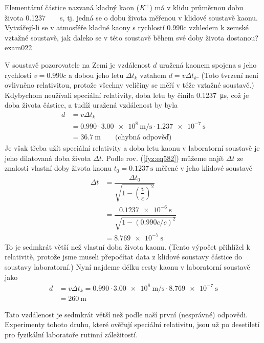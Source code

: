 \begin{fyzexam}{Elementární částice nazvaná kladný kaon (\(K^+\)) má v klidu průměrnou dobu života
  \protect\SI{0.1237}{\protect\micro\protect\s}, tj. jedná se o dobu života měřenou v klidové
  soustavě kaonu. Vytvářejí-li se v atmosféře kladné kaony s rychlostí \num{0.990}c vzhledem k
  zemské vztažné soustavě, jak daleko se v této soustavě během své doby života dostanou?
  \cite[s.~1014]{Halliday2001}}{exam022} 

  \vspace{1em}
  V soustavě pozorovatele na Zemi je vzdálenost \(d\) uražená kaonem spojena s jeho rychlostí \(v =
  \num{0.990}c\) a dobou jeho letu \(\Delta t_k\) vztahem \(d = v\Delta t_k\). (Toto tvrzení není
  ovlivněno relativitou, protože všechny veličiny se měří v téže vztažné soustavě.) Kdybychom
  neužívali speciální relativity, doba letu by činila \SI{0.1237}{\micro\s}, což je doba života
  částice, a tudíž uražená vzdálenost by byla
  \begin{align*}
    d &= v\Delta t_k                                                        \\
      &= \num{0.990}\cdot\SI{3.00e8}{\m\per\s}\cdot\SI{1.237e-7}{\s}        \\
      &= \SI{36.7}{\m}  \qquad\text{(chybná odpověď)} 
  \end{align*}  
  Je však třeba užít speciální relativity a doba letu kaonu v laboratorní soustavě je jeho
  dilatovaná doba života \(\Delta t\). Podle rov. (\ref{fyz:eq582}) můžeme najít \(\Delta t\) ze
  znalosti vlastní doby života kaonu \(t_0 = \SI{0.1237}{\s}\) měřené v jeho klidové soustavě
  \begin{align*}
    \Delta t &= \dfrac{\Delta t_0}{\sqrt{1  - \left(\dfrac{v}{c}\right)^2}}   \\
              &= \dfrac{\SI{0.123 7e-6}{\s}}{\sqrt{1  - (\num{0.990}c/c)^2}}  \\
              &= \SI{8.769e-7}{\s}
  \end{align*}
  To je sedmkrát větší než vlastní doba života kaonu. (Tento výpočet přihlížel k relativitě, protože
  jsme museli přepočítat data z klidové soustavy částice do soustavy laboratorní.) Nyní najdeme
  délku cesty kaonu v laboratorní soustavě jako
  \begin{align*}
    d &= v\Delta t_k                                                      
      = \num{0.990}\cdot\SI{3.00e8}{\m\per\s}\cdot\SI{8.769e-7}{\s}        \\
      &= \SI{260}{\m}  
  \end{align*} 

  {\centering
  \captionsetup{type=figure}
   \par}  

  Tato vzdálenost je sedmkrát větší než podle naší první (nesprávné) odpovědi. Experimenty tohoto
  druhu, které ověřují speciální relativitu, jsou už po desetiletí pro fyzikální laboratoře
  rutinní záležitostí.    
\end{fyzexam}